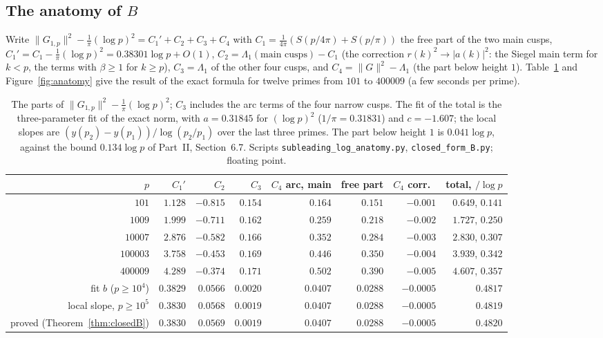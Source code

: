 \documentclass[11pt]{amsart}
\theoremstyle{remark}
\begin{document}
\subsection{The anatomy of \texorpdfstring{$B$}{B}}\label{subsec:anatomy}
Write $\|G_{1,p}\|^2-\frac1\pi(\log p)^2=C_1'+C_2+C_3+C_4$ with $C_1=\frac1{4\pi}(S(p/4\pi)+S(p/\pi))$ the free part of the two main cusps, $C_1'=C_1-\frac1\pi(\log p)^2=0.38301\log p+O(1)$, $C_2=\Lambda_1(\text{main cusps})-C_1$ (the correction $r(k)^2\to|a(k)|^2$: the Siegel main term for $k<p$, the terms with $\beta\ge1$ for $k\ge p$), $C_3=\Lambda_1$ of the other four cusps, and $C_4=\|G\|^2-\Lambda_1$ (the part below height $1$). Table~\ref{tab:anatomy} and Figure~\ref{fig:anatomy} give the result of the exact formula for twelve primes from $101$ to $400009$ (a few seconds per prime).

\begin{table}[htbp]
\centering\footnotesize\setlength{\tabcolsep}{3.5pt}
\begin{tabular}{r|rrrrrr|r}
\toprule
$p$ & $C_1'$ & $C_2$ & $C_3$ & $C_4$ arc, main & free part & $C_4$ corr.\ & total, $/\log p$\\
\midrule
$101$ & $1.128$ & $-0.815$ & $0.154$ & $0.164$ & $0.151$ & $-0.001$ & $0.649$, $0.141$\\
$1009$ & $1.999$ & $-0.711$ & $0.162$ & $0.259$ & $0.218$ & $-0.002$ & $1.727$, $0.250$\\
$10007$ & $2.876$ & $-0.582$ & $0.166$ & $0.352$ & $0.284$ & $-0.003$ & $2.830$, $0.307$\\
$100003$ & $3.758$ & $-0.453$ & $0.169$ & $0.446$ & $0.350$ & $-0.004$ & $3.939$, $0.342$\\
$400009$ & $4.289$ & $-0.374$ & $0.171$ & $0.502$ & $0.390$ & $-0.005$ & $4.607$, $0.357$\\
\midrule
fit $b$ ($p\ge10^4$) & $0.3829$ & $0.0566$ & $0.0020$ & $0.0407$ & $0.0288$ & $-0.0005$ & $0.4817$\\
local slope, $p\ge10^5$ & $0.3830$ & $0.0568$ & $0.0019$ & $0.0407$ & $0.0288$ & $-0.0005$ & $0.4819$\\
proved (Theorem~\ref{thm:closedB}) & $0.3830$ & $0.0569$ & $0.0019$ & $0.0407$ & $0.0288$ & $-0.0005$ & $0.4820$\\
\bottomrule
\end{tabular}
\medskip
\caption{The parts of $\|G_{1,p}\|^2-\frac1\pi(\log p)^2$; $C_3$ includes the arc terms of the four narrow cusps. The fit of the total is the three-parameter fit of the exact norm, with $a=0.31845$ for $(\log p)^2$ ($1/\pi=0.31831$) and $c=-1.607$; the local slopes are $(y(p_2)-y(p_1))/\log(p_2/p_1)$ over the last three primes. The part below height $1$ is $0.041\log p$, against the bound $0.134\log p$ of Part~II, Section~6.7. Scripts \texttt{subleading\_log\_anatomy.py}, \texttt{closed\_form\_B.py}; floating point.}
\label{tab:anatomy}
\end{table}
\end{document}
